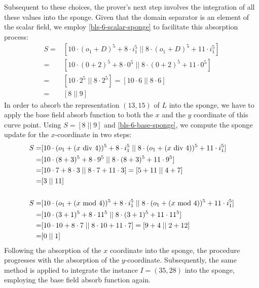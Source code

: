 \begin{example}
Subsequent to these choices, the prover's next step involves the integration of all these values into the sponge. Given that the domain separator is an element of the scalar field, we employ \ref{bls-6-scalar-sponge} to facilitate this absorption process:
\begin{align*}
S = & [10\cdot (o_1+D)^5 + 8\cdot i_1^5 \;||\; 8\cdot (o_1+D)^5 + 11\cdot i_1^5] \\
  = & [10\cdot (0+2)^5 + 8\cdot 0^5 \;||\; 8\cdot (0+2)^5 + 11\cdot 0^5] \\
  = & [10\cdot 2^5 \;||\; 8\cdot 2^5]
  =  [10\cdot 6 \;||\; 8\cdot 6] \\
  = & [8 \;||\; 9]
\end{align*}  
In order to absorb the representation $(13,15)$ of $L$ into the sponge, we have to apply the base field absorb function to both the $x$ and the $y$ coordinate of this curve point. Using $S=[8 \;||\; 9]$ and \ref{bls-6-base-sponge}, we compute the sponge update for the $x$-coordinate in two steps:
\begin{align*}
S = & [10\cdot (o_1+(x \text{ div } 4))^5 + 8\cdot i_1^5 \;||\; 8\cdot (o_1+(x \text{ div } 4))^5 + 11\cdot i_1^5]\\ 
 = & [10\cdot (8+3)^5 + 8\cdot 9^5 \;||\; 8\cdot (8+3)^5 + 11\cdot 9^5]\\ 
 = & [10\cdot 7 + 8\cdot 3 \;||\; 8\cdot 7 + 11\cdot 3]
 =  [5 + 11 \;||\; 4 + 7]\\ 
 = & [3 \;||\; 11]\\
\\
S = & [10\cdot (o_1+(x \text{ mod } 4))^5 + 8\cdot i_1^5 \;||\; 8\cdot (o_1+(x \text{ mod } 4))^5 + 11\cdot i_1^5]\\ 
  = & [10\cdot (3+1)^5 + 8\cdot 11^5 \;||\; 8\cdot (3+1)^5 + 11\cdot 11^5]\\ 
  = & [10\cdot 10 + 8\cdot 7 \;||\; 8\cdot 10 + 11\cdot 7] 
  =  [9 + 4 \;||\; 2 + 12]\\ 
  = & [0 \;||\; 1] 
\end{align*}
Following the absorption of the $x$ coordinate into the sponge, the procedure progresses with the absorption of the $y$-coordinate. Subsequently, the same method is applied to integrate the instance $I=(35,28)$ into the sponge, employing the base field absorb function again. 


\end{example}
